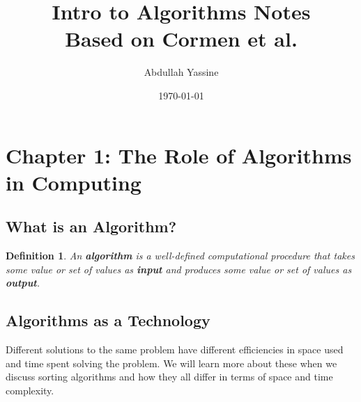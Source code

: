 \documentclass[12pt]{article}
\title{\textbf{Intro to Algorithms Notes}\\[1ex]\large Based on Cormen et al.}
\author{Abdullah Yassine}
\date{\today}
\newtheorem{definition}{Definition}[section]
\newenvironment{examplebox}[1][]{ %
  \begin{tcolorbox}[exampleboxstyle,#1] %
}{
  \end{tcolorbox}
}
\begin{document}
\maketitle
\tableofcontents
\newpage

\section{Chapter 1: The Role of Algorithms in Computing}

\subsection{What is an Algorithm?}
\begin{definition}
An \textbf{algorithm} is a well-defined computational procedure that takes some value or set of values as \textbf{input} and produces some value or set of values as \textbf{output}.
\end{definition}

\subsection{Algorithms as a Technology}

Different solutions to the same problem have different efficiencies in space used and time spent solving the problem. We will learn more about these when we discuss sorting algorithms and how they all differ in terms of space and time complexity. 

\end{document}

